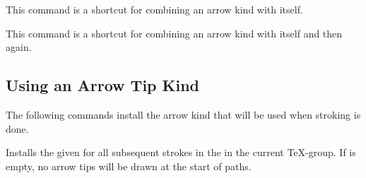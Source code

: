 \begin{command}{\pgfarrowsdeclaredouble{}}
  This command is a shortcut for combining an arrow kind with itself.

\begin{codeexample}[]
%
\begin{pgfpicture}
  \pgfsetarrows{<<->>}
  \pgfsetlinewidth{1ex}
  \pgfpathmoveto{\pgfpointorigin}
  \pgfpathlineto{\pgfpoint{4cm}{2cm}}
\end{pgfpicture}
\end{codeexample} 
\end{command}


\begin{command}{\pgfarrowsdeclaretriple{}}
  This command is a shortcut for combining an arrow kind with itself
  and then again.

\begin{codeexample}[]
%
\begin{pgfpicture}
  \pgfsetarrows{<<<->>>}
  \pgfsetlinewidth{1ex}
  \pgfpathmoveto{\pgfpointorigin}
  \pgfpathlineto{\pgfpoint{4cm}{2cm}}
\end{pgfpicture}
\end{codeexample} 
\end{command}





\subsection{Using an Arrow Tip Kind}

The following commands install the arrow kind that will be used when
stroking is done.

\begin{command}{\pgfsetarrowsstart{}}
  Installs the given  for all subsequent
  strokes in the in the current \TeX-group. If 
  is empty, no arrow tips will be drawn at the start of paths.
\begin{codeexample}[]
\begin{pgfpicture}
  \pgfsetlinewidth{1ex}
  \pgfpathmoveto{\pgfpointorigin}
  \pgfpathlineto{\pgfpoint{4cm}{2cm}}
\end{pgfpicture}
\end{codeexample} 
\end{command}

